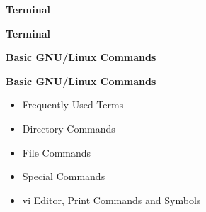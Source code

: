 \documentclass[ignorenonframetext,]{beamer}
\begin{document}
\begin{frame}{\textbf{Terminal}}
\begin{block}{\textbf{Terminal}}
\end{block}

\end{frame}

\begin{frame}{\textbf{Basic GNU/Linux Commands}}

\begin{block}{\textbf{Basic GNU/Linux Commands}}

\begin{itemize}
\item
  Frequently Used Terms
\item
  Directory Commands
\item
  File Commands
\item
  Special Commands
\item
  vi Editor, Print Commands and Symbols
\end{itemize}

\end{block}

\end{frame}
\end{document}
